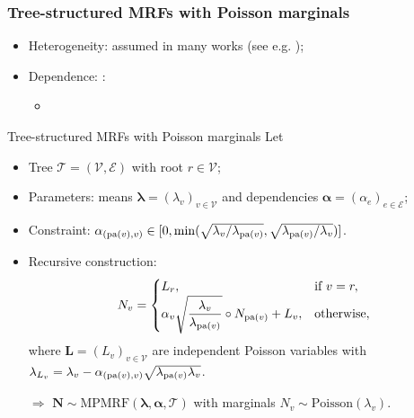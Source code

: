 \documentclass[11pt,xcolor={dvipsnames},hyperref={pdftex,pdfpagemode=UseNone,hidelinks,pdfdisplaydoctitle=true},usepdftitle=false]{beamer}
\begin{document}
\begin{frame}
\frametitle{Tree-structured MRFs with Poisson marginals}
\begin{itemize}
    \item Heterogeneity: assumed in many works (see e.g. \cite{denuit2021risk});
    \item Dependence: 
    : 
    \begin{itemize}
        \item 
    \end{itemize}
\end{itemize}
\end{frame}

\begin{frame}{Tree-structured MRFs with Poisson marginals}
    Let
    \begin{itemize}
            \item Tree $\mathcal{T} = (\mathcal{V}, \mathcal{E})$ with root $r \in \mathcal{V}$;
            \item Parameters: means $\boldsymbol{\lambda} = (\lambda_v)_{v \in \mathcal{V}}$ and dependencies $\boldsymbol{\alpha} = (\alpha_e)_{e \in \mathcal{E}}$;
            \item Constraint: $\alphav{v} \in [0, \min(\sqrt{{\lambda_{v}}/{\lambda_{\pa{v}}}}, \sqrt{{\lambda_{\pa{v}}}/{\lambda_{v}}})]$.
            \item Recursive construction:
        \begin{equation*}
        N_v = 
        \begin{cases}
        L_r, & \text{if } v = r, \\ 
        \alpha_v \sqrt{\dfrac{\lambda_v}{\lambda_{\mathrm{pa}(v)}}} \circ N_{\mathrm{pa}(v)} + L_v, & \text{otherwise},
        \end{cases}
        \end{equation*}
        where $\boldsymbol{L} = (L_v)_{v\in\mathcal{V}}$ are independent Poisson variables with $\lambda_{L_v} = \lambda_v- \alpha_{(\mathrm{pa}(v), v)}\sqrt{\lambda_{\mathrm{pa}(v)}\lambda_v}$.
        
        \item[$\Rightarrow$] $\boldsymbol{N} \sim \text{MPMRF}(\boldsymbol{\lambda}, \boldsymbol{\alpha}, \mathcal{T})$ with marginals $N_v \sim \text{Poisson}(\lambda_v)$.
    \end{itemize}
\end{frame}
\end{document}
